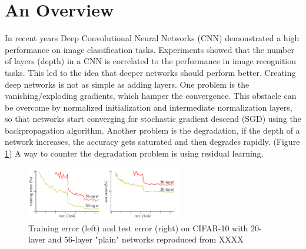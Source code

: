 \documentclass[12pt]{article}
\numberwithin{equation}{section}
\numberwithin{table}{section}
\numberwithin{figure}{section}
\begin{document}
%

\section{An Overview}

In recent years Deep Convolutional Neural Networks (CNN) demonstrated a high performance on image classification tasks. Experiments showed that the number of layers (depth) in a CNN is correlated to the performance in image recognition tasks.  This led to the idea that deeper networks should perform better. Creating deep networks is not as simple as adding layers. One problem is the vanishing/exploding gradients, which hamper the convergence. This obstacle can be overcome by normalized initialization and intermediate normalization layers, so that networks start converging for stochastic gradient descend (SGD) using the backpropagation algorithm. Another problem is the degradation, if the depth of a network increases, the accuracy gets saturated and then degrades rapidly. (Figure \ref{figre6}) A way to counter the degradation problem is using residual learning. 

\begin{figure}[H] \centering
	\includegraphics[width=0.6\textwidth]{image6.png}
	\caption{Training error (left) and test error (right) on CIFAR-10 with 20-layer and 56-layer "plain" networks reproduced from XXXX }
	\label{figre6}
\end{figure}
\end{document}
